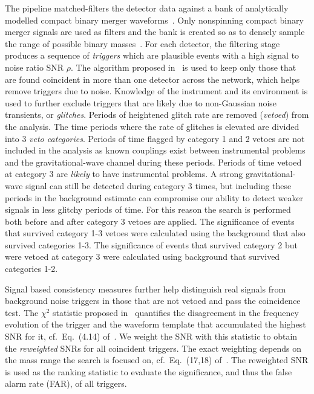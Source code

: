 The pipeline matched-filters the detector data against a bank of
analytically modelled compact binary merger 
waveforms~\cite{Allen:2005fk,Babak:2012zx}. Only nonspinning compact binary 
merger signals are used as filters and the bank is created so as to densely 
sample the range of possible binary masses~\cite{Babak:2006ty}.
For each detector, the filtering stage produces 
a sequence of \textit{triggers} which are plausible events with a high 
signal to noise ratio SNR $\rho$. The algorithm proposed 
in~\cite{Robinson:2008un} is used to keep only those that are found coincident
in more than one detector across the network, which helps remove triggers due to 
noise. 
Knowledge of the instrument and its environment is used to further exclude
triggers that are likely due to non-Gaussian noise transients, or 
\textit{glitches}. Periods of heightened glitch rate are
removed (\emph{vetoed}) from the analysis. The time periods where the rate of 
glitches is elevated are divided into $3$ \emph{veto categories}. Periods of 
time flagged by category 1 and 2 vetoes are
not included in the analysis as known couplings exist between instrumental
problems and the gravitational-wave channel during these periods. Periods of
time vetoed at category 3 are \emph{likely} to have instrumental problems. A
strong gravitational-wave signal can still be detected during category 3 times,
but including these periods in the background estimate can compromise our
ability to detect weaker signals in less glitchy periods of time. For this
reason the search is performed both before and after category 3 vetoes are 
applied. The significance of events
that survived category 1-3 vetoes were calculated using the background that also
survived categories 1-3. The significance of events that survived category 2
but were vetoed at category 3 were calculated using background that survived
categories 1-2.

Signal based 
consistency measures further help distinguish real signals from background noise
triggers in those that are not vetoed and pass the coincidence test. 
The $\chi^{2}$ statistic proposed in~\cite{Allen:2004gu} quantifies the 
disagreement in the frequency evolution of 
the trigger and the waveform template that accumulated the highest SNR
for it, cf.\ Eq.~(4.14) of~\cite{Allen:2004gu}. We weight the SNR with this
statistic to obtain the \textit{reweighted} SNRs for all coincident triggers. 
The exact weighting depends on the mass range the search is focused on, cf.\
Eq.~(17,18) of~\cite{Babak:2012zx}. The reweighted SNR is used as the
ranking statistic to evaluate the significance, and thus the false alarm rate 
(FAR), of all triggers. 

